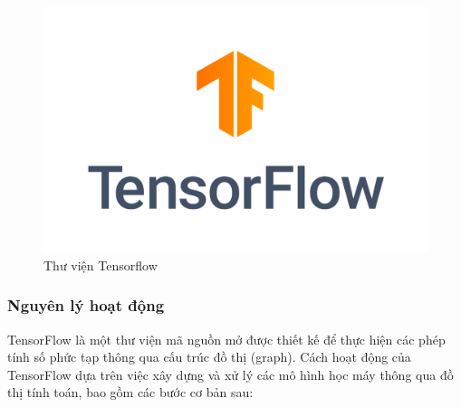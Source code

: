 \begin{figure}[H]
    \centering
    \includegraphics[width=\textwidth,height=\textheight,keepaspectratio]{Images/Theoretical basis/TensorFlow_logo.png}
    \caption{Thư viện Tensorflow}
    \label{fig:enter-label}
\end{figure}

\subsubsection{Nguyên lý hoạt động}
\indent TensorFlow là một thư viện mã nguồn mở được thiết kế để thực hiện các phép tính số phức tạp thông qua cấu trúc đồ thị (graph). Cách hoạt động của TensorFlow dựa trên việc xây dựng và xử lý các mô hình học máy thông qua đồ thị tính toán, bao gồm các bước cơ bản sau:

